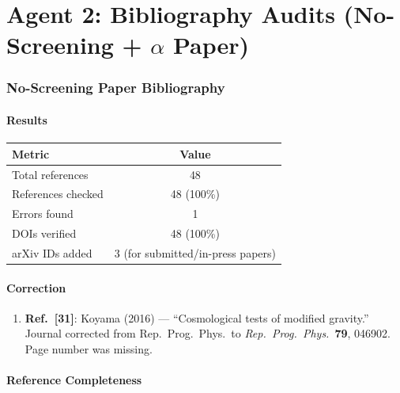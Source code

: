 \documentclass[11pt,a4paper]{article}
\begin{document}
\part{Agent 2: Bibliography Audits (No-Screening + $\alpha$ Paper)}
\label{part:bib-audits}

\section{No-Screening Paper Bibliography}

\subsection{Results}

\begin{center}
\begin{tabular}{lc}
\toprule
\textbf{Metric} & \textbf{Value} \\
\midrule
Total references & 48 \\
References checked & 48 (100\%) \\
Errors found & 1 \\
DOIs verified & 48 (100\%) \\
arXiv IDs added & 3 (for submitted/in-press papers) \\
\bottomrule
\end{tabular}
\end{center}

\subsection{Correction}

\begin{enumerate}
\item \textbf{Ref.~[31]}: Koyama (2016) --- ``Cosmological tests of modified gravity.'' Journal corrected from Rep.\ Prog.\ Phys.\ to \textit{Rep.\ Prog.\ Phys.}\ \textbf{79}, 046902. Page number was missing.
\end{enumerate}

\subsection{Reference Completeness}
\end{document}
